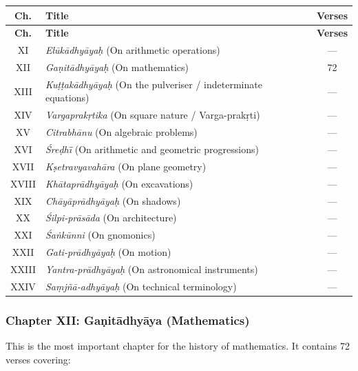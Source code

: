 \documentclass[11pt,a4paper]{article}
\begin{document}
\begin{longtable}{|c|p{8.5cm}|c|}
\hline
\textbf{Ch.} & \textbf{Title} & \textbf{Verses} \\
\hline
\endfirsthead
\hline
\textbf{Ch.} & \textbf{Title} & \textbf{Verses} \\
\hline
\endhead
XI & \textit{El\=uk\=adhy\=ayaḥ} (On arithmetic operations) & --- \\
XII & \textit{Gaṇit\=adhy\=ayaḥ} (On mathematics) & 72 \\
XIII & \textit{Kuṭṭak\=adhy\=ayaḥ} (On the pulveriser / indeterminate equations) & --- \\
XIV & \textit{Vargaprakṛtika} (On square nature / Varga-prakṛti) & --- \\
XV & \textit{Citrabh\=anu} (On algebraic problems) & --- \\
XVI & \textit{\'Sreḍh\=ī} (On arithmetic and geometric progressions) & --- \\
XVII & \textit{Kṣetravyavah\=ara} (On plane geometry) & --- \\
XVIII & \textit{Kh\=atapr\=adhy\=ayaḥ} (On excavations) & --- \\
XIX & \textit{Ch\=ay\=apr\=adhy\=ayaḥ} (On shadows) & --- \\
XX & \textit{\'Silpi-pr\=as\=ada} (On architecture) & --- \\
XXI & \textit{\'Saṅk\=unni} (On gnomonics) & --- \\
XXII & \textit{Gati-pr\=adhy\=ayaḥ} (On motion) & --- \\
XXIII & \textit{Yantra-pr\=adhy\=ayaḥ} (On astronomical instruments) & --- \\
XXIV & \textit{Saṃjñ\=a-adhy\=ayaḥ} (On technical terminology) & --- \\
\hline
\end{longtable}

\subsubsection*{Chapter XII: Gaṇit\=adhyāya (Mathematics)}

This is the most important chapter for the history of mathematics. It contains 72 verses covering:
\end{document}
